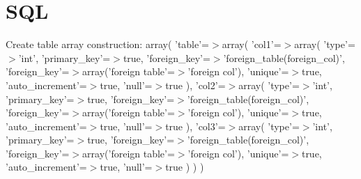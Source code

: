 \hypertarget{_s_q_l-example}{\section{S\-Q\-L}
}
Create table array construction\-: array( 'table'=$>$array( 'col1'=$>$array( 'type'=$>$'int', 'primary\-\_\-key'=$>$true, 'foreign\-\_\-key'=$>$'foreign\-\_\-table(foreign\-\_\-col)', 'foreign\-\_\-key'=$>$array('foreign table'=$>$'foreign col'), 'unique'=$>$true, 'auto\-\_\-increment'=$>$true, 'null'=$>$true ), 'col2'=$>$array( 'type'=$>$'int', 'primary\-\_\-key'=$>$true, 'foreign\-\_\-key'=$>$'foreign\-\_\-table(foreign\-\_\-col)', 'foreign\-\_\-key'=$>$array('foreign table'=$>$'foreign col'), 'unique'=$>$true, 'auto\-\_\-increment'=$>$true, 'null'=$>$true ), 'col3'=$>$array( 'type'=$>$'int', 'primary\-\_\-key'=$>$true, 'foreign\-\_\-key'=$>$'foreign\-\_\-table(foreign\-\_\-col)', 'foreign\-\_\-key'=$>$array('foreign table'=$>$'foreign col'), 'unique'=$>$true, 'auto\-\_\-increment'=$>$true, 'null'=$>$true ) ) )


\begin{DoxyCodeInclude}
\end{DoxyCodeInclude}
 